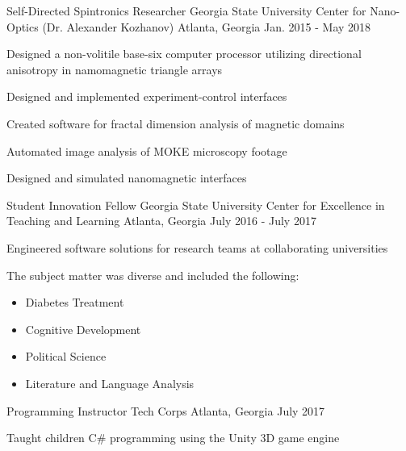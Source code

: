 \begin{cventries}
\cventry
{Self-Directed Spintronics Researcher} %
{Georgia State University Center for Nano-Optics (Dr. Alexander Kozhanov)} %
{Atlanta, Georgia} %
{Jan. 2015 - May 2018} %
{ %
\begin{cvitems}
\item {Designed a non-volitile base-six computer processor utilizing directional anisotropy in namomagnetic \newline triangle arrays}
\item {Designed and implemented experiment-control interfaces}
\item {Created software for fractal dimension analysis of magnetic domains}
\item {Automated image analysis of MOKE microscopy footage}
\item {Designed and simulated nanomagnetic interfaces}
\end{cvitems} 
}


\cventry
{Student Innovation Fellow} %
{Georgia State University Center for Excellence in Teaching and Learning} %
{Atlanta, Georgia} %
{July 2016 - July 2017} %
{ %
\begin{cvitems}
\item {Engineered software solutions for research teams at collaborating universities}
\item {The subject matter was diverse and included the following:}
\begin{itemize}
\item{Diabetes Treatment}
\item{Cognitive Development}
\item{Political Science}
\item{Literature and Language Analysis}
\end{itemize}
\end{cvitems}
}


\cventry
{Programming Instructor} %
{Tech Corps} %
{Atlanta, Georgia} %
{July 2017} %
{ %
\begin{cvitems}
\item {Taught children C\# programming using the Unity 3D game engine}
\end{cvitems}
}


\end{cventries}
